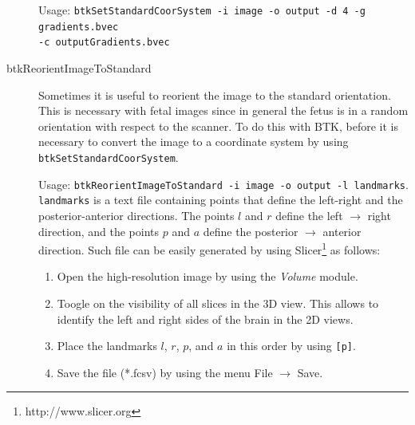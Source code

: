 \begin{description}
Usage: \texttt{btkSetStandardCoorSystem -i image -o output -d 4 -g
gradients.bvec}\\
\texttt{-c outputGradients.bvec}

  \item[btkReorientImageToStandard] Sometimes it is useful
to reorient the image to the standard orientation. This is necessary with fetal
images since in general the fetus is in a random orientation with respect to the
scanner. To do this with BTK, before it is necessary to convert the image
to a coordinate system by using \texttt{btkSetStandardCoorSystem}.

Usage: \texttt{btkReorientImageToStandard -i image -o output -l landmarks}.
\texttt{landmarks} is a text file containing points that define the left-right
and the posterior-anterior directions. The points $l$ and $r$ define the left
$\rightarrow$ right direction, and the points $p$ and $a$ define the posterior
$\rightarrow$ anterior direction. Such file can be easily generated by using
Slicer\footnote{http://www.slicer.org} as follows:

\begin{enumerate}
\item Open the high-resolution image by using the \textit{Volume} module.
\item Toogle on the visibility of all slices in the 3D view. This allows to
identify the left and right sides of the brain in the 2D views.
\item Place the landmarks $l$, $r$, $p$, and $a$ in this order by using
\texttt{[p]}.
\item Save the file (*.fcsv) by using the menu File $\rightarrow$ Save.
\end{enumerate}



\end{description}
